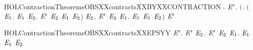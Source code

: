 \newcommand{\HOLContractionTheoremsOBSXXcontractsXXANDXXTRACEXXtau}{\UseVerbatim{HOLContractionTheoremsOBSXXcontractsXXANDXXTRACEXXtau}}
\begin{SaveVerbatim}{HOLContractionTheoremsOBSXXcontractsXXBYXXCONTRACTION}
\HOLTokenTurnstile{} \HOLSymConst{\HOLTokenForall{}}.
         \HOLSymConst{\HOLTokenImp{}}
       \HOLSymConst{\HOLTokenForall{}} \ensuremath{\HOLBoundVar{E}\sp{\prime}}.
           \ensuremath{(}\HOLSymConst{\HOLTokenForall{}}.
                \ensuremath{(}\HOLSymConst{\HOLTokenForall{}}\ensuremath{\HOLBoundVar{E}\sb{\mathrm{1}}}.  \HOLTokenTransBegin{}\HOLTokenTransEnd \ensuremath{\HOLBoundVar{E}\sb{\mathrm{1}}} \HOLSymConst{\HOLTokenImp{}} \HOLSymConst{\HOLTokenExists{}}\ensuremath{\HOLBoundVar{E}\sb{\mathrm{2}}}. \ensuremath{\HOLBoundVar{E}\sp{\prime}} \HOLTokenTransBegin{}\HOLTokenTransEnd \ensuremath{\HOLBoundVar{E}\sb{\mathrm{2}}} \HOLSymConst{\HOLTokenConj{}}  \ensuremath{\HOLBoundVar{E}\sb{\mathrm{1}}} \ensuremath{\HOLBoundVar{E}\sb{\mathrm{2}}}\ensuremath{)} \HOLSymConst{\HOLTokenConj{}}
                \HOLSymConst{\HOLTokenForall{}}\ensuremath{\HOLBoundVar{E}\sb{\mathrm{2}}}. \ensuremath{\HOLBoundVar{E}\sp{\prime}} \HOLTokenTransBegin{}\HOLTokenTransEnd \ensuremath{\HOLBoundVar{E}\sb{\mathrm{2}}} \HOLSymConst{\HOLTokenImp{}} \HOLSymConst{\HOLTokenExists{}}\ensuremath{\HOLBoundVar{E}\sb{\mathrm{1}}}.  \HOLTokenWeakTransBegin{}\HOLTokenWeakTransEnd \ensuremath{\HOLBoundVar{E}\sb{\mathrm{1}}} \HOLSymConst{\HOLTokenConj{}}  \ensuremath{\HOLBoundVar{E}\sb{\mathrm{1}}} \ensuremath{\HOLBoundVar{E}\sb{\mathrm{2}}}\ensuremath{)} \HOLSymConst{\HOLTokenImp{}}
             \ensuremath{\HOLBoundVar{E}\sp{\prime}}
\end{SaveVerbatim}
\newcommand{\HOLContractionTheoremsOBSXXcontractsXXBYXXCONTRACTION}{\UseVerbatim{HOLContractionTheoremsOBSXXcontractsXXBYXXCONTRACTION}}
\begin{SaveVerbatim}{HOLContractionTheoremsOBSXXcontractsXXEPSYY}
\HOLTokenTurnstile{} \HOLSymConst{\HOLTokenForall{}} \ensuremath{\HOLBoundVar{E}\sp{\prime}}.
         \ensuremath{\HOLBoundVar{E}\sp{\prime}} \HOLSymConst{\HOLTokenImp{}}
       \HOLSymConst{\HOLTokenForall{}}\ensuremath{\HOLBoundVar{E}\sb{\mathrm{2}}}.  \ensuremath{\HOLBoundVar{E}\sp{\prime}} \ensuremath{\HOLBoundVar{E}\sb{\mathrm{2}}} \HOLSymConst{\HOLTokenImp{}} \HOLSymConst{\HOLTokenExists{}}\ensuremath{\HOLBoundVar{E}\sb{\mathrm{1}}}.   \ensuremath{\HOLBoundVar{E}\sb{\mathrm{1}}} \HOLSymConst{\HOLTokenConj{}}  \ensuremath{\HOLBoundVar{E}\sb{\mathrm{1}}} \ensuremath{\HOLBoundVar{E}\sb{\mathrm{2}}}
\end{SaveVerbatim}
